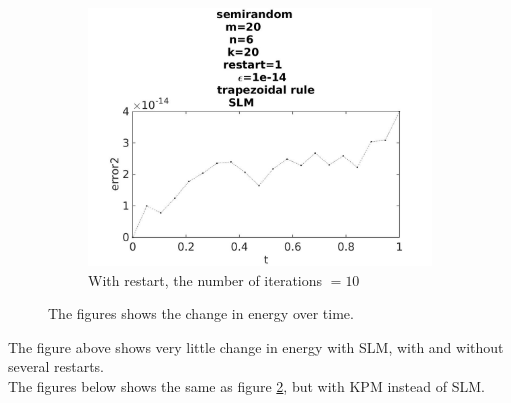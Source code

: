 \begin{figure}[H]
\begin{subfigure}[b]{0.3\textwidth}
                \includegraphics[width=\textwidth]{../MATLAB/fig/errortestrestart1.jpg}
                \caption{ With restart, the number of iterations $= 10$ }
                \label{fig:errortestrestart1}
        \end{subfigure}
        
        
        \caption{ The figures shows the change in energy over time.}
        \label{fig:energytestrestart}
\end{figure}
The figure above shows very little change in energy with SLM, with and without several restarts. \\

The figures below shows the same as figure \ref{fig:energytestrestart}, but with KPM instead of SLM. 

